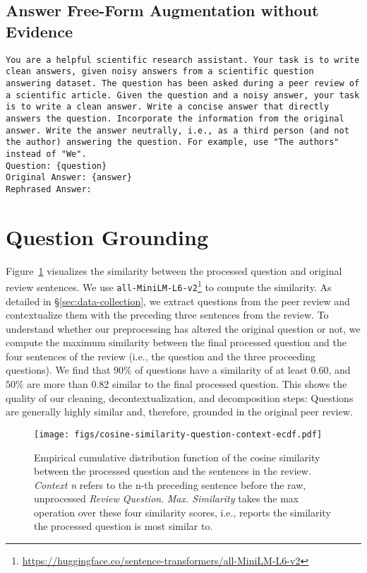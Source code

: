 \subsection{Answer Free-Form Augmentation without Evidence}\label{sec:appendix-answer-augmentation-without-evidence}
\texttt{You are a helpful scientific research assistant. Your task is to write clean answers, given noisy answers from a scientific question answering dataset. The question has been asked during a peer review of a scientific article. Given the question and a noisy answer, your task is to write a clean answer. Write a concise answer that directly answers the question. Incorporate the information from the original answer. Write the answer neutrally, i.e., as a third person (and not the author) answering the question. For example, use "The authors" instead of "We".\\
Question: \{question\}\\
Original Answer: \{answer\}\\
Rephrased Answer:\\
}

\section{Question Grounding}\label{sec:cosine-similarity-question-context}
Figure~\ref{fig:cosine-similarity-question-context} visualizes the similarity between the processed question and original review sentences. We use \texttt{all-MiniLM-L6-v2}\footnote{\url{https://huggingface.co/sentence-transformers/all-MiniLM-L6-v2}} to compute the similarity. As detailed in \S\ref{sec:data-collection}, we extract questions from the peer review and contextualize them with the preceding three sentences from the review. To understand whether our preprocessing has altered the original question or not, we compute the maximum similarity between the final processed question and the four sentences of the review (i.e., the question and the three proceeding questions). We find that $90\%$ of questions have a similarity of at least $0.60$, and $50\%$ are more than $0.82$ similar to the final processed question. This shows the quality of our cleaning, decontextualization, and decomposition steps: Questions are generally highly similar and, therefore, grounded in the original peer review.

\begin{figure}[htpb]
    \centering
    \texttt{[image: figs/cosine-similarity-question-context-ecdf.pdf]}
    \caption{Empirical cumulative distribution function of the cosine similarity between the processed question and the sentences in the review. \textit{Context n} refers to the n-th preceding sentence before the raw, unprocessed \textit{Review Question}. \textit{Max. Similarity} takes the max operation over these four similarity scores, i.e., reports the similarity the processed question is most similar to.}
    \label{fig:cosine-similarity-question-context}
\end{figure}

